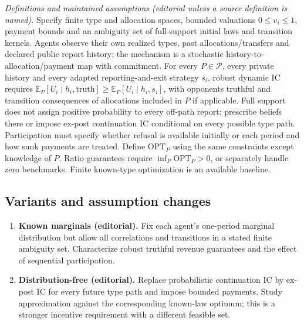 \documentclass[11pt,a4paper]{article}
\begin{document}
\emph{Definitions and maintained assumptions (editorial unless a source definition is named).} Specify finite type and allocation spaces, bounded valuations \(0\le v_i\le1\), payment bounds and an ambiguity set of full-support initial laws and transition kernels. Agents observe their own realized types, past allocations/transfers and declared public report history; the mechanism is a stochastic history-to-allocation/payment map with commitment. For every \(P\in\mathcal P\), every private history and every adapted reporting-and-exit strategy \(s_i\), robust dynamic IC requires \(\mathbb E_P[U_i\mid h_i,\mathrm{truth}]\ge\mathbb E_P[U_i\mid h_i,s_i]\), with opponents truthful and transition consequences of allocations included in \(P\) if applicable. Full support does not assign positive probability to every off-path report; prescribe beliefs there or impose ex-post continuation IC conditional on every possible type path. Participation must specify whether refusal is available initially or each period and how sunk payments are treated. Define \(\mathrm{OPT}_P\) using the same constraints except knowledge of \(P\). Ratio guarantees require \(\inf_P\mathrm{OPT}_P>0\), or separately handle zero benchmarks. Finite known-type optimization is an available baseline.
\subsection*{Variants and assumption changes}
\begin{enumerate}
\item \textbf{Known marginals (editorial).} Fix each agent’s one-period marginal distribution but allow all correlations and transitions in a stated finite ambiguity set. Characterize robust truthful revenue guarantees and the effect of sequential participation.
\item \textbf{Distribution-free (editorial).} Replace probabilistic continuation IC by ex-post IC for every future type path and impose bounded payments. Study approximation against the corresponding known-law optimum; this is a stronger incentive requirement with a different feasible set.
\end{enumerate}
\end{document}
